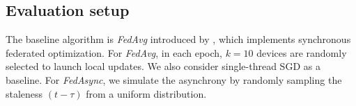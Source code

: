 \documentclass{opt2020} %
\begin{document}





%


\subsection{Evaluation setup}
\label{sec:evaluation_setup}


The baseline algorithm is \textit{FedAvg} introduced by \cite{mcmahan2016communication}, which implements synchronous federated optimization. For \textit{FedAvg}, in each epoch, $k=10$ devices are randomly selected to launch local updates. We also consider single-thread SGD as a baseline. For \textit{FedAsync}, we simulate the asynchrony by randomly sampling the staleness $(t-\tau)$ from a uniform distribution.
\end{document}
